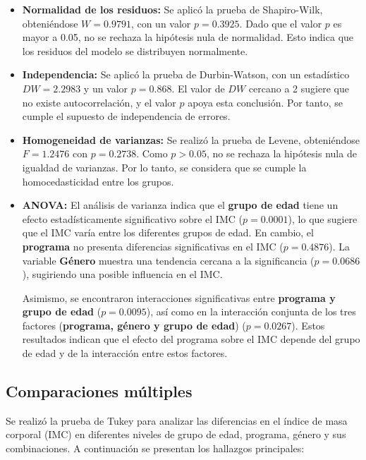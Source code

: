\documentclass{rapport}
\begin{document}
\begin{itemize}
    \item \textbf{Normalidad de los residuos:} Se aplicó la prueba de Shapiro-Wilk, obteniéndose $W = 0.9791$, con un valor $p = 0.3925$. Dado que el valor $p$ es mayor a 0.05, no se rechaza la hipótesis nula de normalidad. Esto indica que los residuos del modelo se distribuyen normalmente.
    
    \item \textbf{Independencia:} Se aplicó la prueba de Durbin-Watson, con un estadístico $DW = 2.2983$ y un valor $p = 0.868$. El valor de $DW$ cercano a 2 sugiere que no existe autocorrelación, y el valor $p$ apoya esta conclusión. Por tanto, se cumple el supuesto de independencia de errores.
    
    \item \textbf{Homogeneidad de varianzas:} Se realizó la prueba de Levene, obteniéndose $F = 1.2476$ con $p = 0.2738$. Como $p > 0.05$, no se rechaza la hipótesis nula de igualdad de varianzas. Por lo tanto, se considera que se cumple la homocedasticidad entre los grupos.

    \item \textbf{ANOVA: }El análisis de varianza indica que el \textbf{grupo de edad} tiene un efecto estadísticamente significativo sobre el IMC (\( p = 0.0001 \)), lo que sugiere que el IMC varía entre los diferentes grupos de edad. En cambio, el \textbf{programa} no presenta diferencias significativas en el IMC (\( p = 0.4876 \)). La variable \textbf{Género} muestra una tendencia cercana a la significancia (\( p = 0.0686 \)), sugiriendo una posible influencia en el IMC.

    Asimismo, se encontraron interacciones significativas entre \textbf{programa y grupo de edad} (\( p = 0.0095 \)), así como en la interacción conjunta de los tres factores (\textbf{programa, género y grupo de edad}) (\( p = 0.0267 \)). Estos resultados indican que el efecto del programa sobre el IMC depende del grupo de edad y de la interacción entre estos factores.
\end{itemize}

\subsection{Comparaciones múltiples}

Se realizó la prueba de Tukey para analizar las diferencias en el índice de masa corporal (IMC) en diferentes niveles de grupo de edad, programa, género y sus combinaciones. A continuación se presentan los hallazgos principales:
\end{document}
